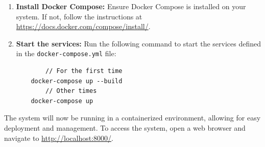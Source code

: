 \begin{enumerate}
    \item \textbf{Install Docker Compose:} Ensure Docker Compose is installed on your system. If not, follow the instructions at \url{https://docs.docker.com/compose/install/}.
    \item \textbf{Start the services:} Run the following command to start the services defined in the \texttt{docker-compose.yml} file:
    \begin{verbatim}
        // For the first time
    docker-compose up --build
        // Other times
    docker-compose up
    \end{verbatim}
\end{enumerate}

The system will now be running in a containerized environment, allowing for easy deployment and management.
To access the system, open a web browser and navigate to \url{http://localhost:8000/}.